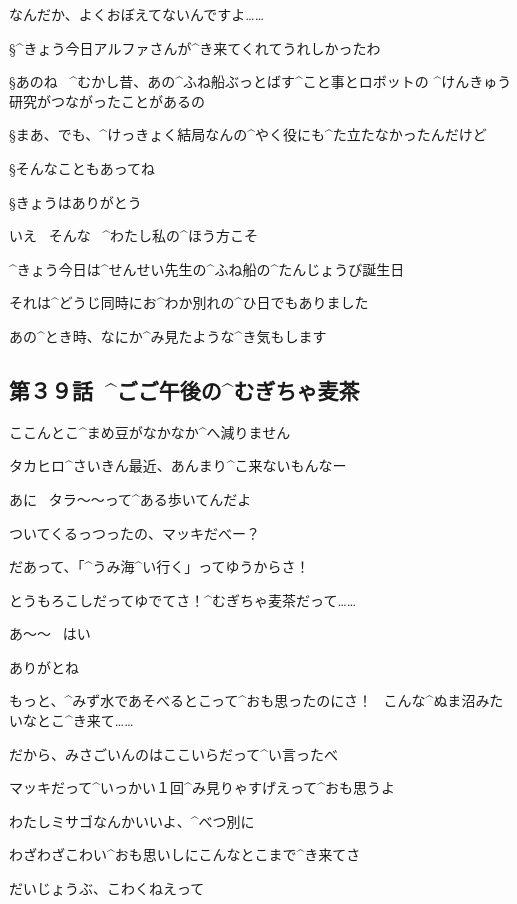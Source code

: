\A なんだか、よくおぼえてないんですよ……

\S ^{きょう}{今日}アルファさんが^{き}{来}てくれてうれしかったわ

\S あのね
\ ^{むかし}{昔}、あの^{ふね}{船}ぶっとばす^{こと}{事}とロボットの
^{けんきゅう}{研究}がつながったことがあるの

\S まあ、でも、^{けっきょく}{結局}なんの^{やく}{役}にも^{た}{立}たなかったんだけど

\S そんなこともあってね

\page
\S きょうはありがとう

\A いえ
\ そんな
\ ^{わたし}{私}の^{ほう}{方}こそ

\A ^{きょう}{今日}は^{せんせい}{先生}の^{ふね}{船}の^{たんじょうび}{誕生日}

\A それは^{どうじ}{同時}にお^{わか}{別}れの^{ひ}{日}でもありました

\page
\A あの^{とき}{時}、なにか^{み}{見}たような^{き}{気}もします


\subsection{第３９話\ ^{ごご}{午後}の^{むぎちゃ}{麦茶}}

\page[100]
\A ここんとこ^{まめ}{豆}がなかなか^{へ}{減}りません

\page
\A タカヒロ^{さいきん}{最近}、あんまり^{こ}{来}ないもんなー

\page[103]
\T あに
\ タラ〜〜って^{ある}{歩}いてんだよ

\T ついてくるっつったの、マッキだべー？

\M だあって、「^{うみ}{海}^{い}{行}く」ってゆうからさ！

\M とうもろこしだってゆでてさ！^{むぎちゃ}{麦茶}だって……

\T あ〜〜
\ はい

\T ありがとね

\M もっと、^{みず}{水}であそべるとこって^{おも}{思}ったのにさ！
\ こんな^{ぬま}{沼}みたいなとこ^{き}{来}て……

\page
\T だから、みさごいんのはここいらだって^{い}{言}ったべ

\T マッキだって^{いっかい}{１回}^{み}{見}りゃすげえって^{おも}{思}うよ

\M わたしミサゴなんかいいよ、^{べつ}{別}に

\M わざわざこわい^{おも}{思}いしにこんなとこまで^{き}{来}てさ

\T だいじょうぶ、こわくねえって

